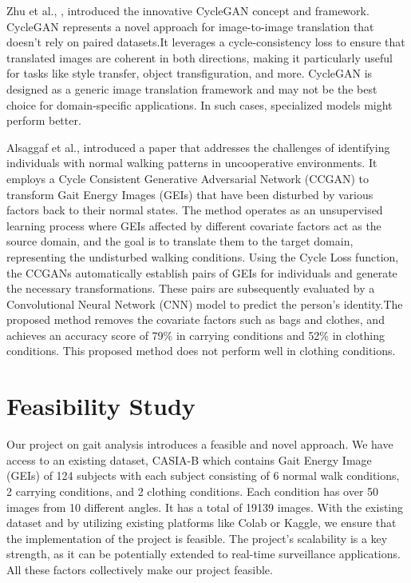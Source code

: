 \documentclass[12pt,a4paper]{article}
\begin{document}
Zhu et al., \cite{zhu2017}, introduced the innovative CycleGAN concept and framework. CycleGAN represents a novel approach for image-to-image translation that doesn't rely on paired datasets.It leverages a cycle-consistency loss to ensure that translated images are coherent in both directions, making it particularly useful for tasks like style transfer, object transfiguration, and more. CycleGAN is designed as a generic image translation framework and may not be the best choice for domain-specific applications. In such cases, specialized models might perform better. 

Alsaggaf et al.,\cite{alsaggaf2021} introduced a paper that addresses the challenges of identifying individuals with normal walking patterns in uncooperative environments. It employs a Cycle Consistent Generative Adversarial Network (CCGAN) to transform Gait Energy Images (GEIs) that have been disturbed by various factors back to their normal states. The method operates as an unsupervised learning process where GEIs affected by different covariate factors act as the source domain, and the goal is to translate them to the target domain, representing the undisturbed walking conditions. Using the Cycle Loss function, the CCGANs automatically establish pairs of GEIs for individuals and generate the necessary transformations. These pairs are subsequently evaluated by a Convolutional Neural Network (CNN) model to predict the person's identity.The proposed method removes the covariate factors such as bags and clothes, and achieves an accuracy score of 79\% in carrying conditions and 52\% in clothing conditions. This proposed method does not perform well in clothing conditions.
\newline
\newline


\section{Feasibility Study}
Our project on gait analysis introduces a feasible and novel approach. We have access to an existing dataset, CASIA-B which contains Gait Energy Image (GEIs) of 124 subjects with each subject consisting of 6 normal walk conditions, 2 carrying conditions, and 2 clothing conditions.  Each condition has over 50 images from 10 different angles. It has a total of 19139 images. With the existing dataset and by utilizing existing platforms like Colab or Kaggle, we ensure that the implementation of the project is feasible. The project's scalability is a key strength, as it can be potentially extended to real-time surveillance applications. All these factors collectively make our project feasible.
\end{document}
